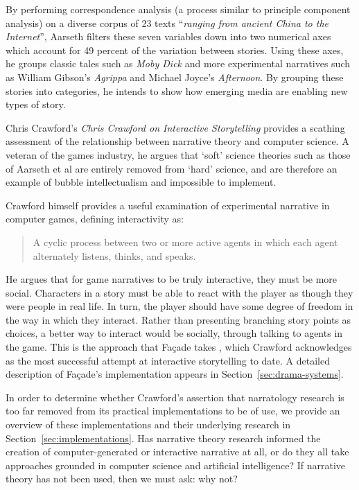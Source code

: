 \documentclass[11pt]{report}
\begin{document}

By performing correspondence analysis (a process similar to principle component analysis) on a diverse corpus of 23 texts ``\emph{ranging from ancient China to the Internet}'', Aarseth filters these seven variables down into two numerical axes which account for 49 percent of the variation between stories. Using these axes, he groups classic tales such as \emph{Moby Dick} and more experimental narratives such as William Gibson's \emph{Agrippa} and Michael Joyce's \emph{Afternoon}. By grouping these stories into categories, he intends to show how emerging media are enabling new types of story.

Chris Crawford's \emph{Chris Crawford on Interactive Storytelling} \citep{crawford2012chris} provides a scathing assessment of the relationship between narrative theory and computer science. A veteran of the games industry, he argues that `soft' science theories such as those of Aarseth et al are entirely removed from `hard' science, and are therefore an example of bubble intellectualism and impossible to implement. 

Crawford himself provides a useful examination of experimental narrative in computer games, defining interactivity as:

\begin{quote}
A cyclic process between two or more active agents in which each agent alternately listens, thinks, and speaks.
\end{quote}

He argues that for game narratives to be truly interactive, they must be more social. Characters in a story must be able to react with the player as though they were people in real life. In turn, the player should have some degree of freedom in the way in which they interact. Rather than presenting branching story points as choices, a better way to interact would be socially, through talking to agents in the game. This is the approach that Fa\c{c}ade takes \citep{mateas2003faccade}, which Crawford acknowledges as the most successful attempt at interactive storytelling to date. A detailed description of Fa\c{c}ade's implementation appears in Section~\ref{sec:drama-systems}.

In order to determine whether Crawford's assertion that narratology research is
too far removed from its practical implementations to be of use, we provide an
overview of these implementations and their underlying research in Section~\ref{sec:implementations}. Has narrative theory research informed the creation of computer-generated or interactive narrative at all, or do they all take approaches grounded in computer science and artificial intelligence? If narrative theory has not been used, then we must ask: why not?
\end{document}
